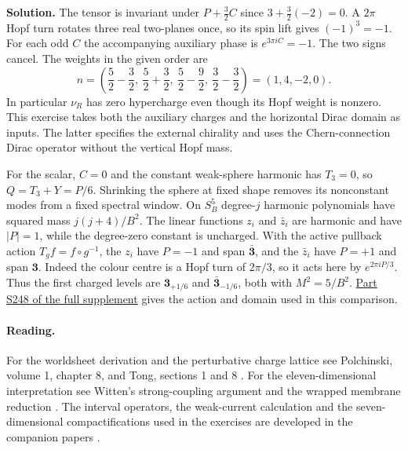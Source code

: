 \documentclass[10pt]{article}
\begin{document}
\noindent\textbf{Solution.}
The tensor is invariant under $P+\tfrac32 C$ since $3+\tfrac32(-2)=0$. A $2\pi$ Hopf turn rotates three real two-planes once, so its spin lift gives $(-1)^3=-1$. For each odd $C$ the accompanying auxiliary phase is $e^{3\pi i C}=-1$. The two signs cancel. The weights in the given order are
\begin{equation}
 n=\left(\frac52-\frac32,\ \frac52+\frac32,\
          \frac52-\frac92,\ \frac32-\frac32\right)
   =(1,4,-2,0).
\end{equation}
In particular $\nu_R$ has zero hypercharge even though its Hopf weight is nonzero. This exercise takes both the auxiliary charges and the horizontal Dirac domain as inputs. The latter specifies the external chirality and uses the Chern-connection Dirac operator without the vertical Hopf mass.

For the scalar, $C=0$ and the constant weak-sphere harmonic has $T_3=0$, so $Q=T_3+Y=P/6$. Shrinking the sphere at fixed shape removes its nonconstant modes from a fixed spectral window. On $S^5_B$ degree-$j$ harmonic polynomials have squared mass $j(j+4)/B^2$. The linear functions $z_i$ and $\bar z_i$ are harmonic and have $|P|=1$, while the degree-zero constant is uncharged. With the active pullback action $T_g f=f\circ g^{-1}$, the $z_i$ have $P=-1$ and span $\bar{\mathbf3}$, and the $\bar z_i$ have $P=+1$ and span $\mathbf3$. Indeed the colour centre is a Hopf turn of $2\pi/3$, so it acts here by $e^{2\pi iP/3}$. Thus the first charged levels are $\mathbf3_{+1/6}$ and $\bar{\mathbf3}_{-1/6}$, both with $M^2=5/B^2$. \href{supplemental.pdf}{Part S248 of the full supplement} gives the action and domain used in this comparison.

\paragraph{Reading.}
For the worldsheet derivation and the perturbative charge lattice see Polchinski, volume 1, chapter 8, and Tong, sections 1 and 8 \cite{Polchinski1998String,Tong2009String}. For the eleven-dimensional interpretation see Witten's strong-coupling argument and the wrapped membrane reduction \cite{Witten1995Circle,DHIS1987}. The interval operators, the weak-current calculation and the seven-dimensional compactifications used in the exercises are developed in the companion papers \cite{boundarynote,TwoEndpoint2026,SevenMTheory2026}.



\end{document}
